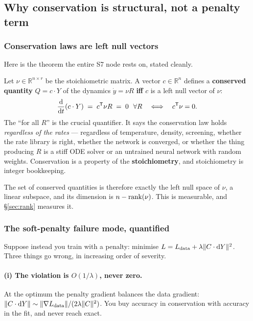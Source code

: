\subsection{Why conservation is structural, not a penalty term}
\label{sec:whystructural}

\subsubsection{Conservation laws are left null vectors}
\label{sec:leftnull}

Here is the theorem the entire S7 node rests on, stated cleanly.

Let $\nu \in \mathbb{R}^{n\times r}$ be the stoichiometric matrix. A vector
$c \in \mathbb{R}^n$ defines a \textbf{conserved quantity} $Q = c\cdot Y$ of the
dynamics $\dot y = \nu R$ \textbf{iff} $c$ is a left null vector of $\nu$:
%
\begin{equation}
\frac{\mathrm{d}}{\mathrm{d} t}(c\cdot Y) \;=\; c^{\mathsf{T}}\nu R \;=\; 0 \ \ \forall R
\quad\Longleftrightarrow\quad c^{\mathsf{T}}\nu = 0.
\label{eq:leftnull}
\end{equation}
%
The ``for all $R$'' is the crucial quantifier. It says the conservation law
holds \emph{regardless of the rates} --- regardless of temperature, density,
screening, whether the rate library is right, whether the network is converged,
or whether the thing producing $R$ is a stiff ODE solver or an untrained neural
network with random weights. Conservation is a property of the
\textbf{stoichiometry}, and stoichiometry is integer bookkeeping.

The set of conserved quantities is therefore exactly the left null space of
$\nu$, a linear subspace, and its dimension is $n - \operatorname{rank}(\nu)$. This is
measurable, and \S\ref{sec:rank} measures it.

\subsubsection{The soft-penalty failure mode, quantified}
\label{sec:softpenalty}

Suppose instead you train with a penalty: minimise
$L = L_{\rm data} + \lambda\|C\cdot \mathrm{d} Y\|^2$. Three things go wrong, in
increasing order of severity.

\paragraph{(i) The violation is $O(1/\lambda)$, never zero.} At the optimum the
penalty gradient balances the data gradient:
$\|C\cdot \mathrm{d} Y\| \sim \|\nabla L_{\rm data}\| / (2\lambda\|C\|^2)$. You buy
accuracy in conservation with accuracy in the fit, and never reach exact.

